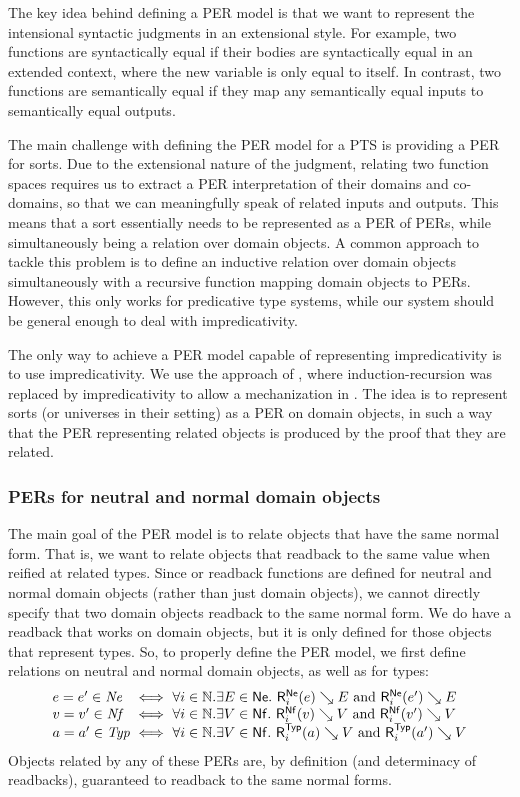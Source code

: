The key idea behind defining a \ac{PER} model is that we want to represent the intensional syntactic judgments in an extensional style.
For example, two functions are syntactically equal if their bodies are syntactically equal in an extended context, where the new variable is only equal to itself.
In contrast, two functions are semantically equal if they map any semantically equal inputs to semantically equal outputs.

The main challenge with defining the \ac{PER} model for a \ac{PTS} is providing a \ac{PER} for sorts.
Due to the extensional nature of the judgment, relating two function spaces requires us to extract a \ac{PER} interpretation of their domains and co-domains,
  so that we can meaningfully speak of related inputs and outputs.
This means that a sort essentially needs to be represented as a \ac{PER} of \acp{PER}, while simultaneously being a relation over domain objects.
A common approach to tackle this problem is to define an inductive relation over domain objects simultaneously with a recursive function mapping domain objects to \acp{PER}.
However, this only works for predicative type systems, while our system should be general enough to deal with impredicativity.

The only way to achieve a \ac{PER} model capable of representing impredicativity is to use impredicativity.
We use the approach of \citet{mctt}, where induction-recursion was replaced by impredicativity to allow a mechanization in \rocq.
The idea is to represent sorts (or universes in their setting) as a \ac{PER} on domain objects,
  in such a way that the \ac{PER} representing related objects is produced by the proof that they are related.


\subsubsection{PERs for neutral and normal domain objects}

The main goal of the \ac{PER} model is to relate objects that have the same normal form.
That is, we want to relate objects that readback to the same value when reified at related types.
Since or readback functions are defined for neutral and normal domain objects (rather than just domain objects),
  we cannot directly specify that two domain objects readback to the same normal form.
We do have a readback that works on domain objects, but it is only defined for those objects that represent types.
So, to properly define the \ac{PER} model, we first define relations on neutral and normal domain objects, as well as for types:
\[
\begin{array}{l@{~\iff~}l}
  \perrel e {e'} \perne  & \forall i \in \Nat.\exists E \in \Ne.\ \rbne e E ~ \text{and} ~ \rbne {e'} E \\
  \perrel v {v'} \pernf  & \forall i \in \Nat.\exists V \in \Nf.\ \rbnf v V ~ \text{and} ~ \rbnf {v'} V \\
  \perrel a {a'} \pertyp & \forall i \in \Nat.\exists V \in \Nf.\ \rbtyp a V ~ \text{and} ~ \rbtyp {a'} V
\end{array}
\]
Objects related by any of these \acp{PER} are, by definition (and determinacy of readbacks), guaranteed to readback to the same normal forms.


